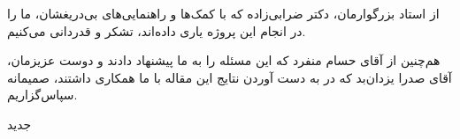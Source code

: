 

\begin{center}
\end{center}

از استاد بزرگوارمان، دکتر ضرابی‌زاده که با کمک‌ها و راهنمایی‌های بی‌دریغشان، ما را در انجام این پروژه یاری داده‌اند، تشکر و قدردانی می‌کنیم.

هم‌چنین از آقای حسام منفرد که این مسئله را به ما پیشنهاد دادند و دوست عزیزمان، آقای صدرا یزدان‌بد که در به دست آوردن نتایج این مقاله با ما همکاری داشتند، صمیمانه سپاس‌گزاریم.

‌جدید
